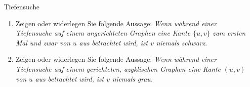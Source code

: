 \documentclass[11pt,a4paper]{article}
\begin{document}
\thispagestyle{empty}
\DeclareRobustCommand{\ttfamily}{\fontencoding{T1}\fontfamily{lmtt}\selectfont}

\newcommand{\quotes}[1]{\glqq{}#1\grqq{}}




\begin{aufgabe}{1}{\hard Tiefensuche}
    \begin{enumerate}
        \item Zeigen oder widerlegen Sie folgende Aussage:
        \emph{Wenn während einer Tiefensuche auf einem ungerichteten Graphen eine Kante $\{u, v\}$ zum ersten Mal und zwar von $u$ aus betrachtet wird, ist $v$ niemals schwarz.}
        \item Zeigen oder widerlegen Sie folgende Aussage:
        \emph{Wenn während einer Tiefensuche auf einem gerichteten, azyklischen Graphen eine Kante $(u, v)$ von $u$ aus betrachtet wird, ist $v$ niemals grau.}
    \end{enumerate}
\end{aufgabe}
\end{document}
